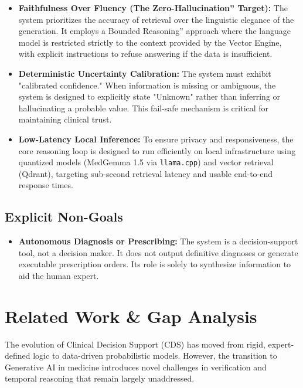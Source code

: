\begin{itemize} 
    \item \textbf{Faithfulness Over Fluency (The Zero-Hallucination'' Target):} The system prioritizes the accuracy of retrieval over the linguistic elegance of the generation. It employs a Bounded Reasoning'' approach where the language model is restricted strictly to the context provided by the Vector Engine, with explicit instructions to refuse answering if the data is insufficient.
    
    \item \textbf{Deterministic Uncertainty Calibration:} The system must exhibit "calibrated confidence." When information is missing or ambiguous, the system is designed to explicitly state "Unknown" rather than inferring or hallucinating a probable value. This fail-safe mechanism is critical for maintaining clinical trust.

    \item \textbf{Low-Latency Local Inference:} To ensure privacy and responsiveness, the core reasoning loop is designed to run efficiently on local infrastructure using quantized models (MedGemma 1.5 via \texttt{llama.cpp}) and vector retrieval (Qdrant), targeting sub-second retrieval latency and usable end-to-end response times.
\end{itemize}

\subsection{Explicit Non-Goals}

\begin{itemize} 
    \item \textbf{Autonomous Diagnosis or Prescribing:} The system is a decision-support tool, not a decision maker. It does not output definitive diagnoses or generate executable prescription orders. Its role is solely to synthesize information to aid the human expert.
    
\end{itemize}

\section{Related Work \& Gap Analysis} \label{sec:related_work}

The evolution of Clinical Decision Support (CDS) has moved from rigid, expert-defined logic to data-driven probabilistic models. However, the transition to Generative AI in medicine introduces novel challenges in verification and temporal reasoning that remain largely unaddressed.

